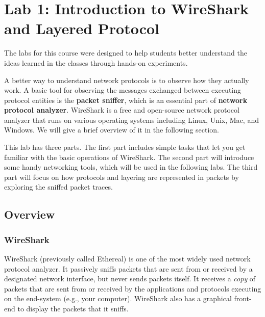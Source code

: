 \chapter{Lab 1: Introduction to WireShark and Layered Protocol}


The labs for this course were designed to help students better
understand the ideas learned in the classes through hands-on
experiments. 

A better way to understand network protocols is to observe how they
actually work.  A basic tool for observing the messages exchanged
between executing protocol entities is the {\bf packet sniffer}, which
is an essential part of {\bf network protocol analyzer}.  WireShark is
a free and open-source network protocol analyzer that runs on various
operating systems including Linux, Unix, Mac, and Windows. We will
give a brief overview of it in the following section.

This lab has three parts. The first part includes simple tasks that let
you get familiar with the basic operations of WireShark. The second
part will introduce some handy networking tools, which will be used in
the following labs. 
The third part will focus on how protocols and layering are represented 
in packets by exploring the sniffed packet traces.


\section{Overview}

\subsection{WireShark}

WireShark (previously called Ethereal) is one of the most widely used
network protocol analyzer. It passively sniffs packets that are sent
from or received by a designated network interface, but never sends
packets itself. It receives a {\em copy} of packets that are sent from
or received by the applications and protocols executing on the end-system
(e.g., your computer).
WireShark also has a graphical front-end to display the packets that
it sniffs.

